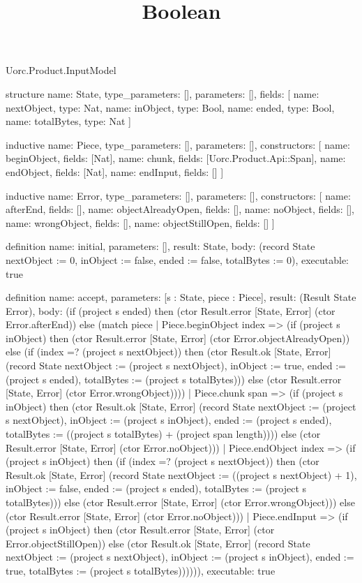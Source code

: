 \begin{lexlean}{Uorc.Product.InputModel}
\title{Boolean}
\begin{semanticmodule}
structure{
  name: State,
  type_parameters: [],
  parameters: [],
  fields: [
    {name: nextObject, type: Nat},
    {name: inObject, type: Bool},
    {name: ended, type: Bool},
    {name: totalBytes, type: Nat}
  ]
}

inductive{
  name: Piece,
  type_parameters: [],
  parameters: [],
  constructors: [
    {name: beginObject, fields: [Nat]},
    {name: chunk, fields: [Uorc.Product.Api::Span]},
    {name: endObject, fields: [Nat]},
    {name: endInput, fields: []}
  ]
}

inductive{
  name: Error,
  type_parameters: [],
  parameters: [],
  constructors: [
    {name: afterEnd, fields: []},
    {name: objectAlreadyOpen, fields: []},
    {name: noObject, fields: []},
    {name: wrongObject, fields: []},
    {name: objectStillOpen, fields: []}
  ]
}

definition{
  name: initial,
  parameters: [],
  result: State,
  body: (record State {nextObject := 0, inObject := false, ended := false, totalBytes := 0}),
  executable: true
}

definition{
  name: accept,
  parameters: [s : State, piece : Piece],
  result: (Result State Error),
  body: (if (project s ended) then (ctor Result.error [State, Error] (ctor Error.afterEnd)) else (match piece
    | Piece.beginObject index => (if (project s inObject) then (ctor Result.error [State, Error] (ctor Error.objectAlreadyOpen)) else (if (index =? (project s nextObject)) then (ctor Result.ok [State, Error] (record State {nextObject := (project s nextObject), inObject := true, ended := (project s ended), totalBytes := (project s totalBytes)})) else (ctor Result.error [State, Error] (ctor Error.wrongObject))))
    | Piece.chunk span => (if (project s inObject) then (ctor Result.ok [State, Error] (record State {nextObject := (project s nextObject), inObject := (project s inObject), ended := (project s ended), totalBytes := ((project s totalBytes) + (project span length))})) else (ctor Result.error [State, Error] (ctor Error.noObject)))
    | Piece.endObject index => (if (project s inObject) then (if (index =? (project s nextObject)) then (ctor Result.ok [State, Error] (record State {nextObject := ((project s nextObject) + 1), inObject := false, ended := (project s ended), totalBytes := (project s totalBytes)})) else (ctor Result.error [State, Error] (ctor Error.wrongObject))) else (ctor Result.error [State, Error] (ctor Error.noObject)))
    | Piece.endInput => (if (project s inObject) then (ctor Result.error [State, Error] (ctor Error.objectStillOpen)) else (ctor Result.ok [State, Error] (record State {nextObject := (project s nextObject), inObject := (project s inObject), ended := true, totalBytes := (project s totalBytes)}))))),
  executable: true
}


\end{semanticmodule}
\end{lexlean}
